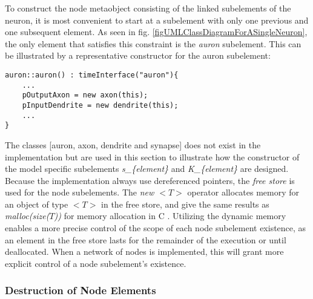  			To construct the node metaobject consisting of the linked subelements of the neuron, it is most convenient to start at a subelement with only one previous and one subsequent element.
			As seen in fig. \ref{figUMLClassDiagramForASingleNeuron}, the only element that satisfies this constraint is the \emph{auron} subelement.
			This can be illustrated by a representative constructor for the auron subelement:
\begin{lstlisting}
auron::auron() : timeInterface("auron"){
	...
	pOutputAxon = new axon(this);
	pInputDendrite = new dendrite(this);
	...
}
\end{lstlisting}
			The classes [auron, axon, dendrite and synapse] does not exist in the implementation but are used in this section to illustrate how the constructor of the model specific
				subelements \emph{s\_\{element\}} and \emph{K\_\{element\}} are designed.
			Because the implementation always use dereferenced pointers, the \emph{free store} is used for the node subelements.
			The \emph{new $<T>$} operator allocates memory for an object of type $<T>$ in the free store, and give the same results as \emph{malloc(size($T$))} for memory allocation in C \cite{Stroustrup2000KAP19}. %
			Utilizing the dynamic memory enables a more precise control of the scope of each node subelement existence, 
				as an element in the free store lasts for the remainder of the execution or until deallocated\cite[Appendix~C.9]{Stroustrup2000}.
			When a network of nodes is implemented, this will grant more explicit control of a node subelement's existence. %

			



			
		\subsubsection{Destruction of Node Elements}
		

